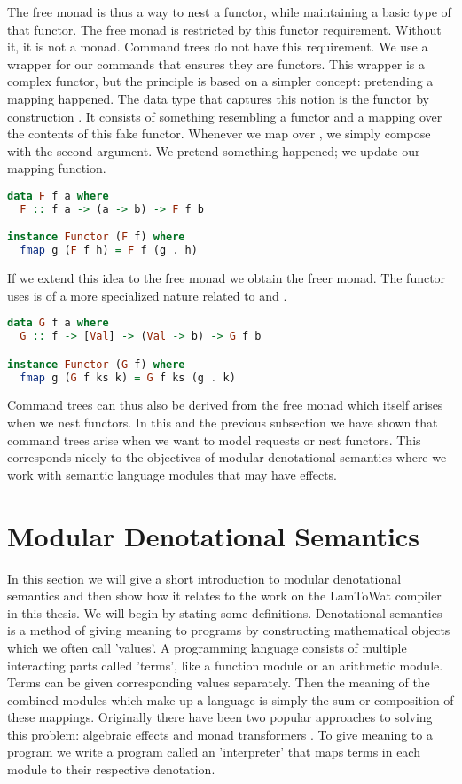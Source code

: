 The free monad is thus a way to nest a functor, while maintaining a basic type of that functor. The free monad is restricted by this functor requirement. Without it, it is not a monad. Command trees do not have this requirement. We use a wrapper for our commands that ensures they are functors. This wrapper is a complex functor, but the principle is based on a simpler concept: pretending a mapping happened. The data type that captures this notion is the functor by construction . It consists of something resembling a functor and a mapping over the contents of this fake functor. Whenever we map over , we simply compose with the second argument. We pretend something happened; we update our mapping function.

\begin{lstlisting}[language=Haskell]
data F f a where
  F :: f a -> (a -> b) -> F f b

instance Functor (F f) where
  fmap g (F f h) = F f (g . h)
\end{lstlisting}

If we extend this idea to the free monad we obtain the freer monad. The functor  uses is of a more specialized nature related to  and .

\begin{lstlisting}[language=Haskell]
data G f a where
  G :: f -> [Val] -> (Val -> b) -> G f b

instance Functor (G f) where
  fmap g (G f ks k) = G f ks (g . k)
\end{lstlisting}

Command trees can thus also be derived from the free monad which itself arises when we nest functors. In this and the previous subsection we have shown that command trees arise when we want to model requests or nest functors. This corresponds nicely to the objectives of modular denotational semantics where we work with semantic language modules that may have effects.

\section{\label{section:denotationalsemantics}Modular Denotational Semantics}
In this section we will give a short introduction to modular denotational semantics and then show how it relates to the work on the LamToWat compiler in this thesis. We will begin by stating some definitions. Denotational semantics is a method of giving meaning to programs by constructing mathematical objects which we often call 'values'. A programming language consists of multiple interacting parts called 'terms', like a function module or an arithmetic module. Terms can be given corresponding values separately. Then the meaning of the combined modules which make up a language is simply the sum or composition of these mappings. Originally there have been two popular approaches to solving this problem: algebraic effects \cite{DBLP:conf/tacs/CartwrightF94} and monad transformers \cite{DBLP:conf/popl/LiangHJ95}. To give meaning to a program we write a program called an 'interpreter' that maps terms in each module to their respective denotation.

